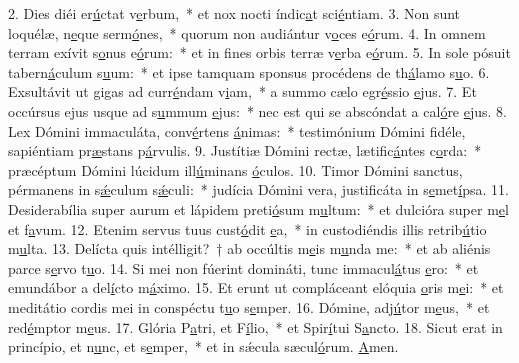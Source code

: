 2. Dies diéi er\uline{ú}ctat v\uline{e}rbum,~* et nox nocti índic\uline{a}t sci\uline{é}ntiam.
3. Non sunt loquélæ, n\uline{e}que serm\uline{ó}nes,~* quorum non audiántur v\uline{o}ces e\uline{ó}rum.
4. In omnem terram exívit s\uline{o}nus e\uline{ó}rum:~* et in fines orbis terræ v\uline{e}rba e\uline{ó}rum.
5. In sole pósuit tabern\uline{á}culum s\uline{u}um:~* et ipse tamquam sponsus procédens de th\uline{á}lamo s\uline{u}o.
6. Exsultávit ut gigas ad curr\uline{é}ndam v\uline{i}am,~* a summo cælo egr\uline{é}ssio \uline{e}jus.
7. Et occúrsus ejus usque ad s\uline{u}mmum \uline{e}jus:~* nec est qui se abscóndat a cal\uline{ó}re \uline{e}jus.
8. Lex Dómini immaculáta, conv\uline{é}rtens \uline{á}nimas:~* testimónium Dómini fidéle, sapiéntiam pr\uline{æ}stans p\uline{á}rvulis.
9. Justítiæ Dómini rectæ, lætific\uline{á}ntes c\uline{o}rda:~* præcéptum Dómini lúcidum ill\uline{ú}minans \uline{ó}culos.
10. Timor Dómini sanctus, pérmanens in s\uline{ǽ}culum s\uline{ǽ}culi:~* judícia Dómini vera, justificáta in s\uline{e}met\uline{í}psa.
11. Desiderabília super aurum et lápidem preti\uline{ó}sum m\uline{u}ltum:~* et dulcióra super m\uline{e}l et f\uline{a}vum.
12. Etenim servus tuus cust\uline{ó}dit \uline{e}a,~* in custodiéndis illis retrib\uline{ú}tio m\uline{u}lta.
13. Delícta quis intélligit?~† ab occúltis m\uline{e}is m\uline{u}nda me:~* et ab aliénis parce s\uline{e}rvo t\uline{u}o.
14. Si mei non fúerint domináti, tunc immacul\uline{á}tus \uline{e}ro:~* et emundábor a del\uline{í}cto m\uline{á}ximo.
15. Et erunt ut compláceant elóquia \uline{o}ris m\uline{e}i:~* et meditátio cordis mei in conspéctu t\uline{u}o s\uline{e}mper.
16. Dómine, adj\uline{ú}tor m\uline{e}us,~* et red\uline{é}mptor m\uline{e}us.
17. Glória P\uline{a}tri, et F\uline{í}lio,~* et Spir\uline{í}tui S\uline{a}ncto.
18. Sicut erat in princípio, et n\uline{u}nc, et s\uline{e}mper,~* et in sǽcula sæcul\uline{ó}rum. \uline{A}men.

